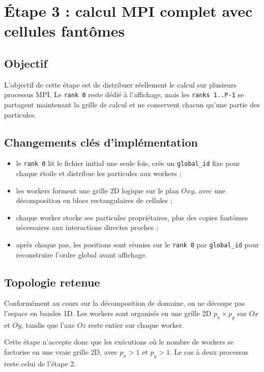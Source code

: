 \section{Étape 3 : calcul MPI complet avec cellules fantômes}

\subsection{Objectif}

L'objectif de cette étape est de distribuer réellement le calcul sur plusieurs processus MPI. Le \texttt{rank 0} reste dédié à l'affichage, mais les \texttt{ranks 1..P-1} se partagent maintenant la grille de calcul et ne conservent chacun qu'une partie des particules.

\subsection{Changements clés d'implémentation}

\begin{itemize}
    \item le \texttt{rank 0} lit le fichier initial une seule fois, crée un \texttt{global\_id} fixe pour chaque étoile et distribue les particules aux workers ;
    \item les workers forment une grille 2D logique sur le plan \(Oxy\), avec une décomposition en blocs rectangulaires de cellules ;
    \item chaque worker stocke ses particules propriétaires, plus des copies fantômes nécessaires aux interactions directes proches ;
    \item après chaque pas, les positions sont réunies sur le \texttt{rank 0} par \texttt{global\_id} pour reconstruire l'ordre global avant affichage.
\end{itemize}

\subsection{Topologie retenue}

Conformément au cours sur la décomposition de domaine, on ne découpe pas l'espace en bandes 1D. Les workers sont organisés en une grille 2D \(p_x \times p_y\) sur \(Ox\) et \(Oy\), tandis que l'axe \(Oz\) reste entier sur chaque worker.

Cette étape n'accepte donc que les exécutions où le nombre de workers se factorise en une vraie grille 2D, avec \(p_x > 1\) et \(p_y > 1\). Le cas à deux processus reste celui de l'étape 2.

